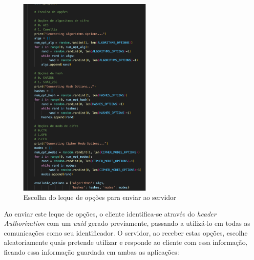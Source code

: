 \documentclass[10pt,english]{article}
\begin{document}
  \begin{figure}[!h]
        \centering
        \includegraphics[width=250]{images/cipher_suite_decision_client.png}
        \caption{Escolha do leque de opções para enviar ao servidor}
    \end{figure}
    
    \clearpage
    
\par Ao enviar este leque de opções, o cliente identifica-se através do \textit{header} \textit{Authorization} com um \textit{uuid} gerado previamente, passando a utilizá-lo em todas as comunicações como seu identificador. O servidor, ao receber estas opções, escolhe aleatoriamente quais pretende utilizar e responde ao cliente com essa informação, ficando essa informação guardada em ambas as aplicações:
\end{document}
